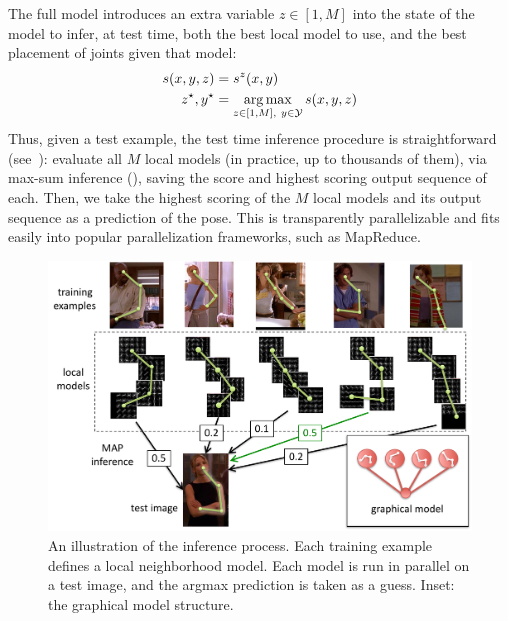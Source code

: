 The full \LLPS model introduces an extra variable $z \in [1,M]$ into the state 
of the model to infer, at test time, both the best local model to use, and the 
best placement of joints given that model:
\begin{align}
s(x,y,z) &= s^z(x,y) \\
z^\star,y^\star &= \mathop{\arg\max}_{z \in [1,M],~y \in \mathcal{Y}} s(x,y,z) 
\end{align}
Thus, given a test example, the test time inference procedure is 
straightforward (see~): evaluate all $M$ local models 
(in practice, up to thousands of them), via max-sum inference 
(), saving the score and highest scoring output sequence of 
each.  Then, we take the highest scoring of the $M$ local models and its output 
sequence as a prediction of the pose.  This is transparently parallelizable and 
fits easily into popular parallelization frameworks, such as MapReduce.

\begin{figure}[tb!]
\centering
\includegraphics[width=0.99\linewidth]{figs/llps-inference.pdf}
\caption[LLPS inference.]{\label{fig:llps-inference} An illustration of the 
inference process.  Each training example defines a local neighborhood model.  
Each model is run in parallel on a test image, and the argmax prediction is 
taken as a guess. Inset: the graphical model structure.}
\end{figure}

